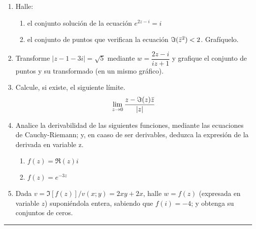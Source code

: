 \documentclass[9pt,a4paper]{extarticle}
\begin{document}
\begin{enumerate}
\item Halle:
\begin{enumerate}
    \item el conjunto solución de la ecuación $e^{2z-i} = i$
    \item el conjunto de puntos que verifican la ecuación $\Im({\Bar{z}}^2) < 2$. Grafíquelo.
\end{enumerate}
\item Transforme $|z-1-3i|=\sqrt{5}$ mediante $w=\dfrac{2z-i}{iz+1}$ y grafique el conjunto de puntos y su transformado (en un mismo gráfico).
\item Calcule, si existe, el siguiente límite. $$\lim_{z \to 0} \dfrac{z-\Im(z)\Bar{z}}{|z|}$$
\item Analice la derivabilidad de las siguientes funciones, mediante las ecuaciones de Cauchy-Riemann; y, en caaso de ser derivables, deduzca la expresión de la derivada en variable z.
\begin{enumerate}
    \item $f(z)=\Re(z)i$
    \item $f(z)=e^{-3z}$
\end{enumerate}

\item Dada $v=\Im[f(z)]/v(x;y)=2xy+2x$, halle $w=f(z)$ (expresada en variable $z$) suponiéndola entera, sabiendo que $f(i)=-4$; y obtenga su conjuntos de ceros.
\end{enumerate}
\hrule
\end{document}
